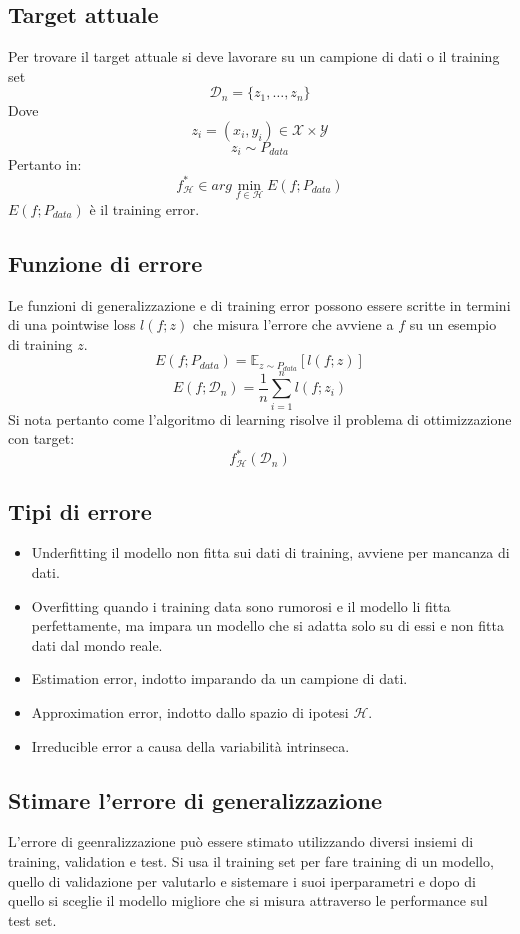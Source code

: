 	\subsection{Target attuale}
	Per trovare il target attuale si deve lavorare su un campione di dati o il training set
	$$\mathcal{D}_n=\{z_1,\dots,z_n\}$$
	Dove
	$$z_i=(x_i,y_i)\in\mathcal{X}\times\mathcal{Y}$$
	$$z_i\sim P_{data}$$
	Pertanto in:
	$$f^*_{\mathcal{H}}\in arg\min\limits_{f\in\mathcal{H}} E(f;P_{data})$$
	$E(f;P_{data})$ \`e il training error.

	\subsection{Funzione di errore}
	Le funzioni di generalizzazione e di training error possono essere scritte in termini di una pointwise loss $l(f;z)$ che misura l'errore che avviene a $f$ su un esempio di training $z$.
	$$E(f;P_{data})=\mathbb{E}_{z\sim P_{data}}[l(f;z)]$$
	$$E(f;\mathcal{D}_n)=\dfrac{1}{n}\sum\limits_{i=1}^nl(f;z_i)$$
	Si nota pertanto come l'algoritmo di learning risolve il problema di ottimizzazione con target:
	$$f^*_\mathcal{H}(\mathcal{D}_n)$$

	\subsection{Tipi di errore}
	\begin{multicols}{2}
		\begin{itemize}
			\item Underfitting il modello non fitta sui dati di training, avviene per mancanza di dati.
			\item Overfitting quando i training data sono rumorosi e il modello li fitta perfettamente, ma impara un modello che si adatta solo su di essi e non fitta dati dal mondo reale.
			\item Estimation error, indotto imparando da un campione di dati.
			\item Approximation error, indotto dallo spazio di ipotesi $\mathcal{H}$.
			\item Irreducible error a causa della variabilit\`a intrinseca.
		\end{itemize}
	\end{multicols}

	\subsection{Stimare l'errore di generalizzazione}
	L'errore di geenralizzazione pu\`o essere stimato utilizzando diversi insiemi di training, validation e test.
	Si usa il training set per fare training di un modello, quello di validazione per valutarlo e sistemare i suoi iperparametri e dopo di quello si sceglie il modello migliore che si misura attraverso le performance sul test set.

